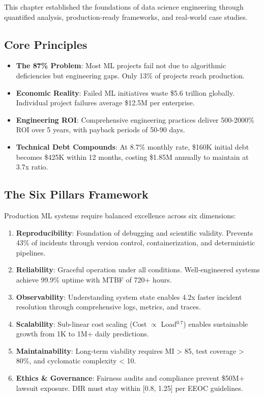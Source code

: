 This chapter established the foundations of data science engineering through quantified analysis, production-ready frameworks, and real-world case studies.

\subsection{Core Principles}

\begin{itemize}
    \item \textbf{The 87\% Problem}: Most ML projects fail not due to algorithmic deficiencies but engineering gaps. Only 13\% of projects reach production.

    \item \textbf{Economic Reality}: Failed ML initiatives waste \$5.6 trillion globally. Individual project failures average \$12.5M per enterprise.

    \item \textbf{Engineering ROI}: Comprehensive engineering practices deliver 500-2000\% ROI over 5 years, with payback periods of 50-90 days.

    \item \textbf{Technical Debt Compounds}: At 8.7\% monthly rate, \$160K initial debt becomes \$425K within 12 months, costing \$1.85M annually to maintain at 3.7x ratio.
\end{itemize}

\subsection{The Six Pillars Framework}

Production ML systems require balanced excellence across six dimensions:

\begin{enumerate}
    \item \textbf{Reproducibility}: Foundation of debugging and scientific validity. Prevents 43\% of incidents through version control, containerization, and deterministic pipelines.

    \item \textbf{Reliability}: Graceful operation under all conditions. Well-engineered systems achieve 99.9\% uptime with MTBF of 720+ hours.

    \item \textbf{Observability}: Understanding system state enables 4.2x faster incident resolution through comprehensive logs, metrics, and traces.

    \item \textbf{Scalability}: Sub-linear cost scaling (Cost $\propto$ Load$^{0.7}$) enables sustainable growth from 1K to 1M+ daily predictions.

    \item \textbf{Maintainability}: Long-term viability requires MI > 85, test coverage > 80\%, and cyclomatic complexity < 10.

    \item \textbf{Ethics \& Governance}: Fairness audits and compliance prevent \$50M+ lawsuit exposure. DIR must stay within [0.8, 1.25] per EEOC guidelines.
\end{enumerate}

